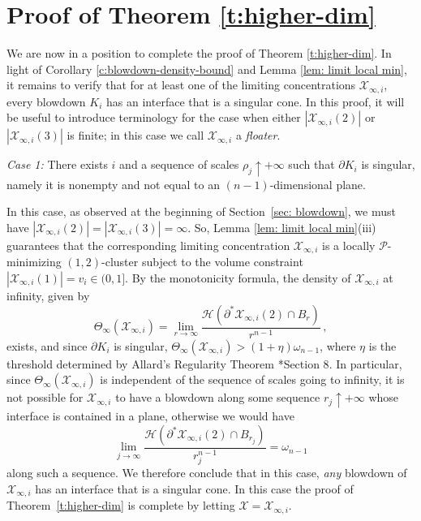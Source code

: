 \documentclass[10pt,reqno]{amsart}
\numberwithin{equation}{section}
\theoremstyle{definition}
\newcommand{\Hcal}{\mathcal{H}}
\newcommand{\Pcal}{\mathcal{P}}
\newcommand{\X}{\mathcal{X}}
\begin{document}
{%
\section{Proof of Theorem \ref{t:higher-dim}}


We are now in a position to complete the proof of Theorem \ref{t:higher-dim}. In light of Corollary \ref{c:blowdown-density-bound} and Lemma \ref{lem: limit local min}, it remains to verify that for at least one of the limiting concentrations $\X_{\infty,i}$, every blowdown $K_i$ has an interface that is a singular cone.
In this proof, it will be useful to introduce terminology for the case when either $|\X_{\infty,i}(2)|$ or $|\X_{\infty,i}(3)|$ is finite; in this case we call $\X_{\infty, i}$ a \emph{floater}.


\medskip

\textit{Case 1:} There exists $i$ and a sequence of scales $\rho_j \uparrow +\infty$ such that $\partial K_i$ is singular, namely it is nonempty and not equal to an $(n-1)$-dimensional plane.

In this case, 
%
as observed at the beginning of Section~\ref{sec: blowdown}, we must have $|\X_{\infty,i}(2)|= |\X_{\infty,i}(3)| = \infty$. So, Lemma \ref{lem: limit local min}(iii) guarantees that the corresponding limiting concentration $\X_{\infty,i}$ is a locally $\Pcal$-minimizing $(1,2)$-cluster subject to the volume constraint $|\X_{\infty,i}(1)|=v_i\in (0,1]$. By the monotonicity formula, the density of $\X_{\infty,i}$ at infinity, given by
\[
    \Theta_\infty(\X_{\infty,i}) = \lim_{r\to\infty} \frac{\Hcal(\partial^*\X_{\infty,i}(2)\cap B_r)}{r^{n-1}}\,,
\]
exists, and since $\partial K_i$ is singular, $\Theta_\infty(\X_{\infty,i}) > (1 + \eta)\omega_{n-1}$, where $\eta$ is the threshold determined by Allard's Regularity Theorem \cite{Allard_72}*{Section 8}. In particular, since $\Theta_\infty(\X_{\infty,i})$ is independent of the sequence of scales going to infinity, it is not possible for $\X_{\infty,i}$ to have a blowdown along some sequence $r_j \uparrow +\infty$ whose interface is contained in a plane, otherwise we would have
\[
    \lim_{j\to\infty} \frac{\Hcal(\partial^*\X_{\infty,i}(2)\cap B_{r_j})}{r_j^{n-1}} = \omega_{n-1}
\]
along such a sequence. We therefore conclude that in this case, \emph{any} blowdown of $\X_{\infty,i}$ has an interface that is a singular cone. In this case the proof of Theorem~\ref{t:higher-dim} is complete by letting $\X= \X_{\infty, i}$.

}
\end{document}
